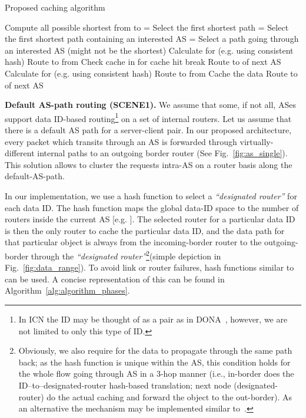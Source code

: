 \documentclass[article]{elsarticle}
\begin{document}
\begin{algorithm}
\footnotesize
  \caption{Proposed caching algorithm}
  \label{alg:algorithm_phases}
  \begin{algorithmic}
    \Statex {}
        \State Compute all possible shortest  from  to 
          \State  = Select the first shortest path
          \State  = Select the first shortest path containing an interested AS
          \State  = Select a path going through an interested AS (might not be the shortest)
        \EndIf
      \EndIf
        \State Calculate  for  (e.g. using consistent hash)
        \State Route to  from 
        \State Check cache in  for cache hit
          \State break
        \Else
          \State Route to  of next AS
        \EndIf
      \EndFor
{}
        \State Calculate  for  (e.g. using consistent hash)
        \State Route to  from 
          \State Cache the data
        \EndIf
        \State Route to  of next AS
      \EndFor
  \end{algorithmic}
\end{algorithm}
\normalsize
      
\textbf{Default AS-path routing (SCENE1).} We assume that some, if not all, ASes support data ID-based routing\footnote{In ICN the ID may be thought of as a pair  as in DONA~\cite{dona}, however, we are not limited to only this type of ID.} on a set of internal routers. Let us assume that there is a default AS path for a server-client pair. In our proposed architecture, every packet which transits through an AS is forwarded through virtually-different internal paths to an outgoing border router (See Fig.~\ref{fig:as_single}). This solution allows to cluster the requests intra-AS on a router basis along the default-AS-path. 

In our implementation, we use a hash function to select a \textit{``designated router''} for each data ID. The hash function maps the global data-ID space to the number of routers inside the current AS [e.g. ]. The selected router for a particular data ID is then the only router to cache the particular data ID, and the data path for that particular object is always from the incoming-border router to the outgoing-border through the \textit{``designated router''}\footnote{Obviously, we also require for the data to propagate through the same path back; as the hash function is unique within the AS, this condition holds for the whole flow going through AS in a 3-hop manner (i.e., in-border does the ID--to--designated-router hash-based translation; next node (designated-router) do the actual caching and forward the object to the out-border). As an alternative the mechanism may be implemented similar to~\cite{http}.}(simple depiction in Fig.~\ref{fig:data_range}). To avoid link or router failures, hash functions similar to~\cite{consistenthash} can be used. A concise representation of this can be found in Algorithm~\ref{alg:algorithm_phases}.
\end{document}
